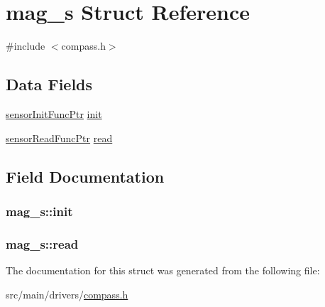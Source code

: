 \hypertarget{structmag__s}{\section{mag\+\_\+s Struct Reference}
\label{structmag__s}
}


{\ttfamily \#include $<$compass.\+h$>$}

\subsection*{Data Fields}
\begin{DoxyCompactItemize}
\item 
\hyperlink{sensor_8h_ac0d29dff109db338a85908aad6cea6df}{sensor\+Init\+Func\+Ptr} \hyperlink{structmag__s_adcba83f7a423ed871be1b3e6ec346642}{init}
\item 
\hyperlink{sensor_8h_af1826dc6e1452a4b956e54abacce853e}{sensor\+Read\+Func\+Ptr} \hyperlink{structmag__s_a17b2ec07670b48322b3a06c0123846cc}{read}
\end{DoxyCompactItemize}


\subsection{Field Documentation}
\hypertarget{structmag__s_adcba83f7a423ed871be1b3e6ec346642}{
\subsubsection[{init}]{ mag\+\_\+s\+::init}}\label{structmag__s_adcba83f7a423ed871be1b3e6ec346642}
\hypertarget{structmag__s_a17b2ec07670b48322b3a06c0123846cc}{
\subsubsection[{read}]{ mag\+\_\+s\+::read}}\label{structmag__s_a17b2ec07670b48322b3a06c0123846cc}


The documentation for this struct was generated from the following file\+:\begin{DoxyCompactItemize}
\item 
src/main/drivers/\hyperlink{drivers_2compass_8h}{compass.\+h}\end{DoxyCompactItemize}

